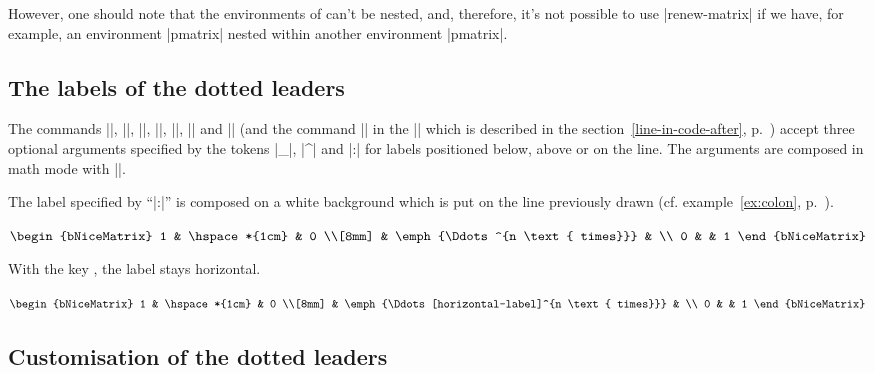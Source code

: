 \documentclass[dvipsnames]{article}
\begin{document}
\bigskip
However, one should note that the environments of  can't be
nested, and, therefore, it's not possible to use |renew-matrix| if we have, for
example, an environment |{pmatrix}| nested within another environment |{pmatrix}|.


\subsection{The labels of the dotted leaders}



The commands |\Ldots|, |\Cdots|, |\Vdots|, |\Ddots|, |\Iddots|, |\Hdotsfor| and
|\Vdotsfor| (and the command |\line| in the |\CodeAfter| which is described in
the section~\ref{line-in-code-after}, p.~\pageref{line-in-code-after}) accept
three optional arguments specified by the tokens |_|, |^| and |:| for labels
positioned below, above or on the line. The arguments are composed in math mode
with |\scriptstyle|.

The label specified by ``|:|'' is composed on a white background which is put on
the line previously drawn (cf. example~\ref{ex:colon}, p.~\pageref{ex:colon}).

\bigskip
\begin{Code}[width=11cm,show-output]
$\begin{bNiceMatrix}
1 & \hspace*{1cm}            & 0 \\[8mm]
  & \emph{\Ddots^{n \text{ times}}} &   \\
0 &                          & 1 
\end{bNiceMatrix}$
\end{Code}

\bigskip
With the key , the label stays horizontal.

\nobreak
\medskip
\begin{Code}[width=11cm,show-output]
$\begin{bNiceMatrix}
1 & \hspace*{1cm}            & 0 \\[8mm]
  & \emph{\Ddots[horizontal-label]^{n \text{ times}}} &   \\
0 &                          & 1 
\end{bNiceMatrix}$
\end{Code}

\subsection{Customisation of the dotted leaders}
\end{document}

